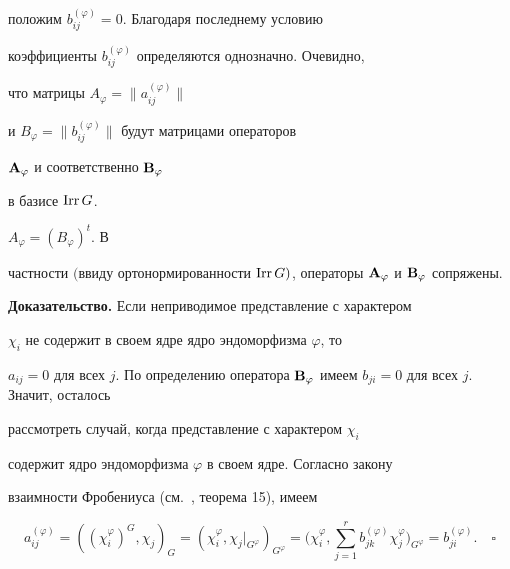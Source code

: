 положим $b^{(\varphi)}_{ij}=0$. Благодаря последнему условию


коэффициенты $b^{(\varphi)}_{ij}$ определяются однозначно. Очевидно,


что матрицы $A_{\varphi}=\|a^{(\varphi)}_{ij}\|$


и $B_{\varphi}=\|b^{(\varphi)}_{ij}\|$ будут матрицами операторов


${\bold A}_{\varphi}$ и соответственно ${\bold B}_{\varphi}$


в базисе $\operatorname{Irr} G$.





\begin{lem}\label{ABsopr}


$A_{\varphi}=(B_{\varphi})^{t}$. В


частности $($ввиду ортонормированности $\Irr G)$, операторы ${\bold


A}_{\varphi}$ и ${\bold B}_{\varphi}$ сопряжены.


\end{lem}





{\bf Доказательство.} Если неприводимое представление с характером


$\chi_{i}$ не содержит в своем ядре ядро эндоморфизма $\varphi$, то


$a_{ij}=0$ для всех $j$. По определению оператора ${\bold


B}_{\varphi}$ имеем $b_{ji}=0$ для всех $j$. Значит, осталось


рассмотреть случай, когда представление с характером $\chi_{i}$


содержит ядро эндоморфизма $\varphi$ в своем ядре. Согласно закону


взаимности Фробениуса (см.~\cite{BelFomin}, теорема 15), имеем


$$


a^{(\varphi)}_{ij}=((\chi^{\varphi}_{i})^{G},\chi_{j})_{G}=


(\chi^{\varphi}_{i},


\chi_{j}|_{{G^{\varphi}}})_{{G^{\varphi}}}=


\bigg(\chi^{\varphi}_{i},\sum\limits^{r}_{j=1}


b^{(\varphi)}_{jk}\chi^{\varphi}_{j}\bigg)_{{G^{\varphi}}}=


b^{(\varphi)}_{ji}.\quad\square


$$





